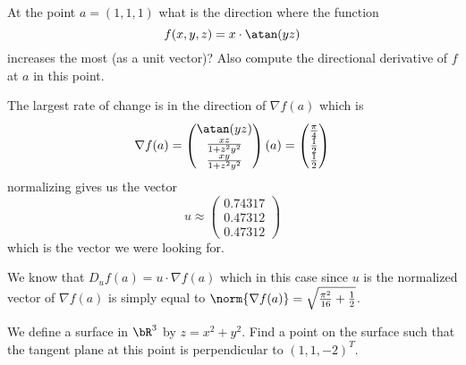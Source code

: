 \documentclass[10pt]{article}
\begin{document}
\begin{exercise*}

    At the point $a=(1,1,1)$ what is the direction where the function
        \[ f(x,y,z) = x\cdot\atan(yz) \]
    increases the most (as a unit vector)?
    Also compute the directional derivative of $f$ at $a$ in this point.

\end{exercise*}

\begin{blankpp}

    The largest rate of change is in the direction of $\nabla f(a)$ which is
        \[ \nabla f(a) = \begin{pmatrix} \atan(yz) \\ \frac{xz}{1+z^2y^2} \\ \frac{xy}{1+z^2y^2} \end{pmatrix}(a) = \begin{pmatrix} \frac\pi4 \\ \frac12 \\ \frac12 \end{pmatrix} \]
    normalizing gives us the vector
        \[ u \approx \begin{pmatrix} 0.74317 \\ 0.47312 \\ 0.47312 \end{pmatrix} \]
    which is the vector we were looking for.

    We know that $D_uf(a)=u\cdot\nabla f(a)$ which in this case since $u$ is the normalized vector of $\nabla f(a)$ is simply equal to $\norm{\nabla f(a)}=\sqrt{\frac{\pi^2}{16}+\frac12}$.

\end{blankpp}

\begin{exercise*}

    We define a surface in $\bR^3$ by $z=x^2+y^2$.
    Find a point on the surface such that the tangent plane at this point is perpendicular to $(1, 1, -2)^T$.

\end{exercise*}
\end{document}
